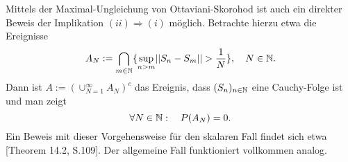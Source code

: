 \begin{remark}
    Mittels der Maximal-Ungleichung von Ottaviani-Skorohod ist auch ein direkter Beweis der Implikation $(ii) \Rightarrow (i)$ möglich. Betrachte hierzu etwa die Ereignisse 
    $$
        A_N := \bigcap_{m \in \mathbb{N}}\{\sup_{n > m} \lvert\lvert S_n - S_m \rvert\rvert > \frac{1}{N}\}, \quad N \in \mathbb{N}.                                                                                                                        
    $$
    Dann ist $A := (\cup_{N=1}^{\infty} A_N)^c$ das Ereignis, dass $(S_n)_{n \in \mathbb{N}}$ eine Cauchy-Folge ist und man zeigt 
    $$
        \forall N \in \mathbb{N}: \quad P(A_N) = 0. 
    $$
    Ein Beweis mit dieser Vorgehensweise für den skalaren Fall findet sich etwa \cite{bauer}[Theorem 14.2, S.109]. Der allgemeine Fall funktioniert vollkommen analog. 
\end{remark}



